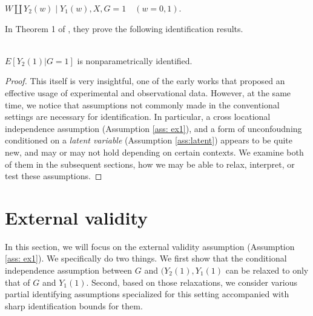 \documentclass{article}
\begin{document}
\begin{assumption} \label{ass:latent}
    $W \amalg Y_2(w) \mid Y_1(w), X, G=1\quad(w =0,1)$.
\end{assumption}

In Theorem 1 of \cite{athey2020combining}, they prove the following identification results. 
\begin{theorem}\\
$E[ Y_2(1) | G = 1 ]$ is nonparametrically identified. 
\end{theorem}
\begin{proof}
    This itself is very insightful, one of the early works that proposed an effective usage of experimental and observational data. However, at the same time, we notice that assumptions not commonly made in the conventional settings are necessary for identification. In particular, a cross locational independence assumption (Assumption \ref{ass: ex1}), and a form of unconfoudning conditioned on a \textit{latent variable} (Assumption \ref{ass:latent}) appears to be quite new, and may or may not hold depending on certain contexts. We examine both of them in the subsequent sections, how we may be able to relax, interpret, or test these assumptions.
\end{proof}

\section{External validity}
In this section, we will focus on the external validity assumption (Assumption \ref{ass: ex1}). We specifically do two things. We first show that the conditional independence assumption between $G$ and $(Y_2(1), Y_1(1)$ can be relaxed to only that of $G$ and $Y_1(1)$. Second, based on those relaxations, we consider various partial identifying assumptions specialized for this setting accompanied with sharp identification bounds for them. 
\end{document}
